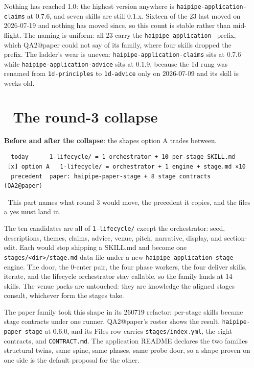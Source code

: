 Nothing has reached 1.0: the highest version anywhere is \texttt{haipipe-application-claims} at 0.7.6, and seven skills are still 0.1.x. Sixteen of the 23 last moved on 2026-07-19 and nothing has moved since, so this count is stable rather than mid-flight. The naming is uniform: all 23 carry the \texttt{haipipe-application-} prefix, which QA2@paper could not say of its family, where four skills dropped the prefix. The ladder's wear is uneven: \texttt{haipipe-application-claims} sits at 0.7.6 while \texttt{haipipe-application-advice} sits at 0.1.9, because the 1d rung was renamed from \texttt{1d-principles} to \texttt{1d-advice} only on 2026-07-09 and its skill is weeks old.


\section{🔻 The round-3 collapse}
\textbf{Before and after the collapse}: the shapes option A trades between.

\begin{verbatim}
  today      1-lifecycle/ = 1 orchestrator + 10 per-stage SKILL.md
 [x] option A   1-lifecycle/ = orchestrator + 1 engine + stage.md ×10
  precedent  paper: haipipe-paper-stage + 8 stage contracts (QA2@paper)
\end{verbatim}
📌 This part names what round 3 would move, the precedent it copies, and the files a yes must land in.

The ten candidates are all of \texttt{1-lifecycle/} except the orchestrator: seed, descriptions, themes, claims, advice, venue, pitch, narrative, display, and section-edit. Each would stop shipping a SKILL.md and become one \texttt{stages/<dir>/stage.md} data file under a new \texttt{haipipe-application-stage} engine. The door, the 0-enter pair, the four phase workers, the four deliver skills, iterate, and the lifecycle orchestrator stay callable, so the family lands at 14 skills. The venue packs are untouched: they are knowledge the aligned stages consult, whichever form the stages take.

The paper family took this shape in its 260719 refactor: per-stage skills became stage contracts under one runner. QA2@paper's roster shows the result, \texttt{haipipe-paper-stage} at 0.6.0, and its Files row carries \texttt{stages/index.yml}, the eight contracts, and \texttt{CONTRACT.md}. The application README declares the two families structural twins, same spine, same phases, same probe door, so a shape proven on one side is the default proposal for the other.

